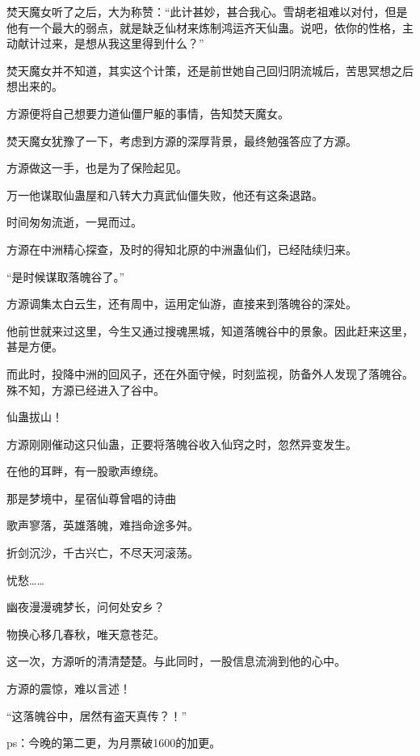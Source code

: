 \begin{this_body}
焚天魔女听了之后，大为称赞：“此计甚妙，甚合我心。雪胡老祖难以对付，但是他有一个最大的弱点，就是缺乏仙材来炼制鸿运齐天仙蛊。说吧，依你的性格，主动献计过来，是想从我这里得到什么？”

焚天魔女并不知道，其实这个计策，还是前世她自己回归阴流城后，苦思冥想之后想出来的。

方源便将自己想要力道仙僵尸躯的事情，告知焚天魔女。

焚天魔女犹豫了一下，考虑到方源的深厚背景，最终勉强答应了方源。

方源做这一手，也是为了保险起见。

万一他谋取仙蛊屋和八转大力真武仙僵失败，他还有这条退路。

时间匆匆流逝，一晃而过。

方源在中洲精心探查，及时的得知北原的中洲蛊仙们，已经陆续归来。

“是时候谋取落魄谷了。”

方源调集太白云生，还有周中，运用定仙游，直接来到落魄谷的深处。

他前世就来过这里，今生又通过搜魂黑城，知道落魄谷中的景象。因此赶来这里，甚是方便。

而此时，投降中洲的回风子，还在外面守候，时刻监视，防备外人发现了落魄谷。殊不知，方源已经进入了谷中。

仙蛊拔山！

方源刚刚催动这只仙蛊，正要将落魄谷收入仙窍之时，忽然异变发生。

在他的耳畔，有一股歌声缭绕。

那是梦境中，星宿仙尊曾唱的诗曲

歌声寥落，英雄落魄，难挡命途多舛。

折剑沉沙，千古兴亡，不尽天河滚荡。

忧愁……

幽夜漫漫魂梦长，问何处安乡？

物换心移几春秋，唯天意苍茫。

这一次，方源听的清清楚楚。与此同时，一股信息流淌到他的心中。

方源的震惊，难以言述！

“这落魄谷中，居然有盗天真传？！”

ps：今晚的第二更，为月票破1600的加更。

\end{this_body}

